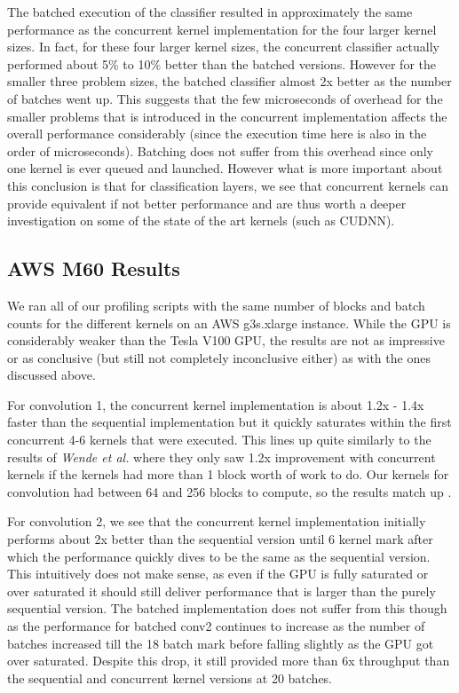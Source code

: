 \documentclass[sigconf]{acmart}
\begin{document}
The batched execution of the classifier resulted in approximately the same performance as the concurrent kernel implementation for the four larger kernel sizes. In fact, for these four larger kernel sizes, the concurrent classifier actually performed about 5\% to 10\% better than the batched versions. However for the smaller three problem sizes, the batched classifier almost 2x better as the number of batches went up. This suggests that the few microseconds of overhead for the smaller problems that is introduced in the concurrent implementation affects the overall performance considerably (since the execution time here is also in the order of microseconds). Batching does not suffer from this overhead since only one kernel is ever queued and launched. However what is more important about this conclusion is that for classification layers, we see that concurrent kernels can provide equivalent if not better performance and are thus worth a deeper investigation on some of the state of the art kernels (such as CUDNN).


\subsection{AWS M60 Results}
We ran all of our profiling scripts with the same number of blocks and batch counts for the different kernels on an AWS g3s.xlarge instance. While the GPU is considerably weaker than the Tesla V100 GPU, the results are not as impressive or as conclusive (but still not completely inconclusive either) as with the ones discussed above. 
  
For convolution 1, the concurrent kernel implementation is about 1.2x - 1.4x faster than the sequential implementation but it quickly saturates within the first concurrent 4-6 kernels that were executed. This lines up quite similarly to the results of \textit{Wende et al.} where they only saw 1.2x improvement with concurrent kernels if the kernels had more than 1 block worth of work to do. Our kernels for convolution had between 64 and 256 blocks to compute, so the results match up \cite{wende_cordes_steinke_2012}. 
  
For convolution 2, we see that the concurrent kernel implementation initially performs about 2x better than the sequential version until 6 kernel mark after which the performance quickly dives to be the same as the sequential version. This intuitively does not make sense, as even if the GPU is fully saturated or over saturated it should still deliver performance that is larger than the purely sequential version. The batched implementation does not suffer from this though as the performance for batched conv2 continues to increase as the number of batches increased till the 18 batch mark before falling slightly as the GPU got over saturated. Despite this drop, it still provided more than 6x throughput than the sequential and concurrent kernel versions at 20 batches.
  
\end{document}
